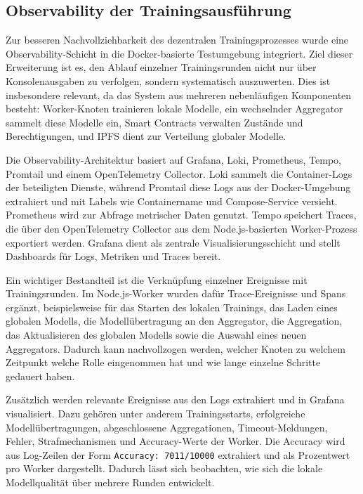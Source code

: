 \subsection{Observability der Trainingsausführung}

Zur besseren Nachvollziehbarkeit des dezentralen Trainingsprozesses wurde eine Observability-Schicht in die Docker-basierte Testumgebung integriert. Ziel dieser Erweiterung ist es, den Ablauf einzelner Trainingsrunden nicht nur über Konsolenausgaben zu verfolgen, sondern systematisch auszuwerten. Dies ist insbesondere relevant, da das System aus mehreren nebenläufigen Komponenten besteht: Worker-Knoten trainieren lokale Modelle, ein wechselnder Aggregator sammelt diese Modelle ein, Smart Contracts verwalten Zustände und Berechtigungen, und IPFS dient zur Verteilung globaler Modelle.

Die Observability-Architektur basiert auf Grafana, Loki, Prometheus, Tempo, Promtail und einem OpenTelemetry Collector. Loki sammelt die Container-Logs der beteiligten Dienste, während Promtail diese Logs aus der Docker-Umgebung extrahiert und mit Labels wie Containername und Compose-Service versieht. Prometheus wird zur Abfrage metrischer Daten genutzt. Tempo speichert Traces, die über den OpenTelemetry Collector aus dem Node.js-basierten Worker-Prozess exportiert werden. Grafana dient als zentrale Visualisierungsschicht und stellt Dashboards für Logs, Metriken und Traces bereit.

Ein wichtiger Bestandteil ist die Verknüpfung einzelner Ereignisse mit Trainingsrunden. Im Node.js-Worker wurden dafür Trace-Ereignisse und Spans ergänzt, beispielsweise für das Starten des lokalen Trainings, das Laden eines globalen Modells, die Modellübertragung an den Aggregator, die Aggregation, das Aktualisieren des globalen Modells sowie die Auswahl eines neuen Aggregators. Dadurch kann nachvollzogen werden, welcher Knoten zu welchem Zeitpunkt welche Rolle eingenommen hat und wie lange einzelne Schritte gedauert haben.

Zusätzlich werden relevante Ereignisse aus den Logs extrahiert und in Grafana visualisiert. Dazu gehören unter anderem Trainingsstarts, erfolgreiche Modellübertragungen, abgeschlossene Aggregationen, Timeout-Meldungen, Fehler, Strafmechanismen und Accuracy-Werte der Worker. Die Accuracy wird aus Log-Zeilen der Form \texttt{Accuracy: 7011/10000} extrahiert und als Prozentwert pro Worker dargestellt. Dadurch lässt sich beobachten, wie sich die lokale Modellqualität über mehrere Runden entwickelt.

